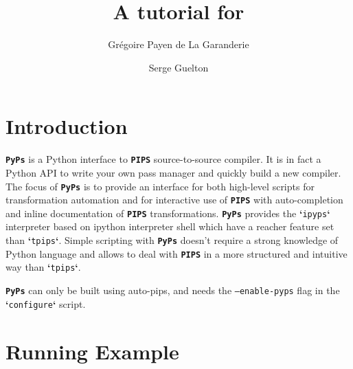 \documentclass[a4paper]{article}
\title{A tutorial for \PYPS}
\author{Grégoire Payen de La Garanderie \and Serge Guelton}
\newcommand{\PIPS}{\textbf{\texttt{PIPS}}}
\newcommand{\PYPS}{\textbf{\texttt{PyPs}}}
\newcommand{\cmd}[1]{\textbf{`}\texttt{#1}\textbf{`}}
\begin{document}
\maketitle

\section{Introduction}
\PYPS{} is a Python interface to \PIPS{} source-to-source compiler.
It is in fact a Python API to write your own pass manager and
quickly build a new compiler.
The focus of \PYPS{} is to provide an interface for both high-level scripts for transformation automation
and for interactive use of \PIPS{} with auto-completion and inline documentation of \PIPS{} transformations.
\PYPS{} provides the \cmd{ipyps} interpreter based on ipython interpreter shell which have a reacher feature set than \cmd{tpips}.
Simple scripting with \PYPS{} doesn't require a strong knowledge of Python language and allows to deal with \PIPS{} in a more structured and intuitive way than \cmd{tpips}.

\PYPS{} can only be built using auto-pips, and needs the \texttt{--enable-pyps} flag in the \cmd{configure} script.

\section{Running Example}
\end{document}
